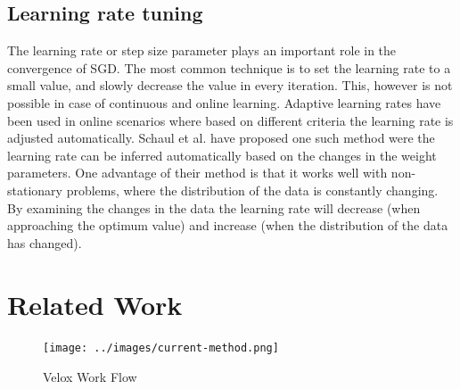 \documentclass{sig-alternate-05-2015}
\begin{document}
\subsection{Learning rate tuning} \label{learning-rate}
The learning rate or step size parameter plays an important role in the convergence of SGD.
The most common technique is to set the learning rate to a small value, and slowly decrease the value in every iteration. 
This, however is not possible in case of continuous and online learning. 
Adaptive learning rates have been used in online scenarios where based on different criteria the learning rate is adjusted automatically.
Schaul et al. \cite{schaul2013no} have proposed one such method were the learning rate can be inferred automatically based on the changes in the weight parameters. 
One advantage of their method is that it works well with non-stationary problems, where the distribution of the data is constantly changing. 
By examining the changes in the data the learning rate will decrease (when approaching the optimum value) and increase (when the distribution of the data has changed).

\section{Related Work} \label{related-work}

\begin{figure}[t]
\centering
\texttt{[image: ../images/current-method.png]}
\caption{Velox Work Flow}
\label{fig:velox-work-flow}
\end{figure}
\end{document}
